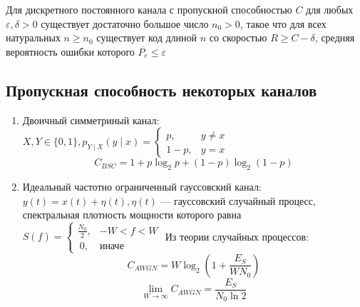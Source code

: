 \begin{theorem}[прямая]
    Для дискретного постоянного канала с пропускной способностью \(C\) для любых \(\varepsilon, \delta > 0\) существует достаточно большое число \(n_0 > 0\), такое что для всех натуральных \(n \ge n_0\) существует код длиной \(n\) со скоростью \(R \ge C - \delta\), средняя вероятность ошибки которого \(\overline{P_e} \le \varepsilon\)
\end{theorem}

\subsection{Пропускная способность некоторых каналов}

\begin{enumerate}
    \item Двоичный симметриный канал: \(X, Y \in \{0, 1\}, p_{Y \mid X}(y \mid x) = \begin{cases}
              p,      & y \neq x \\
              1 - p , & y = x
          \end{cases}\)
          \[C_{BSC} = 1 + p \log_2 p + (1 - p) \log_2(1 - p)\]
    \item Идеальный частотно ограниченный гауссовский канал: \(y(t) = x(t) + \eta(t), \eta(t)\) --- гауссовский случайный процесс, спектральная плотность мощности которого равна \(S(f) = \begin{cases}
              \frac{N_0}{2}, & -W < f < W   \\\
              0,             & \text{иначе}
          \end{cases}\)
          Из теории случайных процессов:
          \[C_{AWGN} = W \log_2 \left(1 + \frac{E_S}{WN_0}\right)\]
          \[\lim_{W \to \infty} C_{AWGN} = \frac{E_S}{N_0 \ln 2}\]
\end{enumerate}
